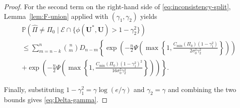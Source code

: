\documentclass[10pt,a4paper]{amsart}
\newcommand{\bP}{\mathbb{P}}
\renewcommand{\le}{\leqslant}
\begin{document}
\begin{proof}
For the second term on the right-hand side of \eqref{eq:inconsistency-split},
Lemma~\ref{lem:F-union} applied with $(\gamma_1,\gamma_2)$ yields
\begin{align*}
&\bP\left(
\widehat{\Pi}\neq \Pi_0
\mid
\mathcal{E}\cap\{\phi(\bm U^*,\bm U)>1-\gamma_2^2\}
\right)\\&
\le
\sum_{m=n-k}^n\binom{n}{m}D_{n-m}
\left\{
\exp\left(
-\frac{n}{2}\Psi\left(
\max\left\{1,
\frac{C_{\min}(\Pi_0)(1-\gamma_1^2)}{2\sigma_0^2\gamma_2^2}
\right\}
\right)
\right)\right.\\&
+
\left.\exp\left(
-\frac{n}{2}\Psi\left(
\max\left\{1,
\frac{C_{\min}(\Pi_0)(1-\gamma_1^2)^2}{16\sigma_0^2\gamma_2^2}
\right\}
\right)
\right)
\right\}.    
\end{align*}

Finally, substituting $1-\gamma_1^2=\gamma\log(e/\gamma)$ and $\gamma_2=\gamma$
and combining the two bounds gives \eqref{eq:Delta-gamma}.
\end{proof}
\end{document}
